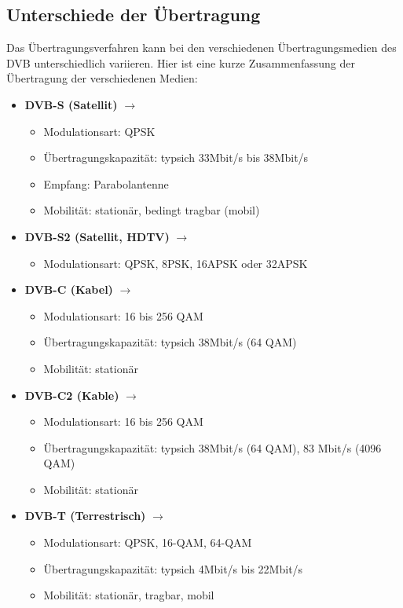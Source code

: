 \documentclass[a4paper]{article}
\begin{document}
\subsection{Unterschiede der Übertragung}

Das Übertragungsverfahren kann bei den verschiedenen Übertragungsmedien des DVB unterschiedlich variieren. Hier ist eine kurze Zusammenfassung der Übertragung der verschiedenen Medien:

\begin{itemize}

	\item \textbf{DVB-S (Satellit)} $\rightarrow$ \begin{itemize}
	\item Modulationsart: QPSK
	\item Übertragungskapazität: typsich 33Mbit/s bis 38Mbit/s
	\item Empfang: Parabolantenne 
	\item Mobilität: stationär, bedingt tragbar (mobil)
	\end{itemize}
	
	\item \textbf{DVB-S2 (Satellit, HDTV)} $\rightarrow$ \begin{itemize}
	\item Modulationsart: QPSK, 8PSK, 16APSK oder 32APSK
	\end{itemize}	
	
	\item \textbf{DVB-C (Kabel)} $\rightarrow$ \begin{itemize}
	\item Modulationsart: 16 bis 256 QAM
	\item Übertragungskapazität: typsich 38Mbit/s (64 QAM)
	\item Mobilität: stationär
	\end{itemize}

	\item \textbf{DVB-C2 (Kable)} $\rightarrow$ \begin{itemize}
	\item Modulationsart: 16 bis 256 QAM
	\item Übertragungskapazität: typsich 38Mbit/s (64 QAM), 83 Mbit/s (4096 QAM)
	\item Mobilität: stationär
	\end{itemize}
	
	\item \textbf{DVB-T (Terrestrisch)} $\rightarrow$ \begin{itemize}
	\item Modulationsart: QPSK, 16-QAM, 64-QAM
	\item Übertragungskapazität: typsich 4Mbit/s bis 22Mbit/s
	\item Mobilität: stationär, tragbar, mobil
	\end{itemize}

\end{itemize}
\end{document}
